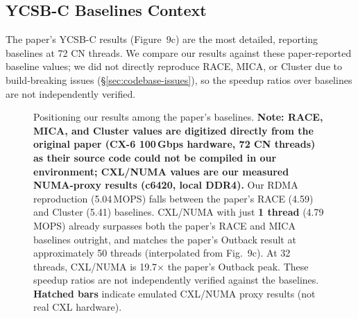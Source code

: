 \documentclass[conference]{IEEEtran}
\begin{document}
\subsection{YCSB-C Baselines Context}

The paper's YCSB-C results (Figure~9c) are the most detailed, reporting baselines at 72 CN threads. We compare our results against these paper-reported baseline values; we did not directly reproduce RACE, MICA, or Cluster due to build-breaking issues (\S\ref{sec:codebase-issues}), so the speedup ratios over baselines are not independently verified.

\begin{figure}[H]
\centering
{}
\caption{Positioning our results among the paper's baselines. \textbf{Note: RACE, MICA, and Cluster values are digitized directly from the original paper (CX-6 100\,Gbps hardware, 72 CN threads) as their source code could not be compiled in our environment; CXL/NUMA values are our measured NUMA-proxy results (c6420, local DDR4).} Our RDMA reproduction (5.04\,MOPS) falls between the paper's RACE (4.59) and Cluster (5.41) baselines. CXL/NUMA with just \textbf{1 thread} (4.79\,MOPS) already surpasses both the paper's RACE and MICA baselines outright, and matches the paper's Outback result at approximately 50 threads (interpolated from Fig.~9c). At 32 threads, CXL/NUMA is 19.7$\times$ the paper's Outback peak. These speedup ratios are not independently verified against the baselines. \textbf{Hatched bars} indicate emulated CXL/NUMA proxy results (not real CXL hardware).}
\label{fig:baselines-detail}
\end{figure}
\end{document}
